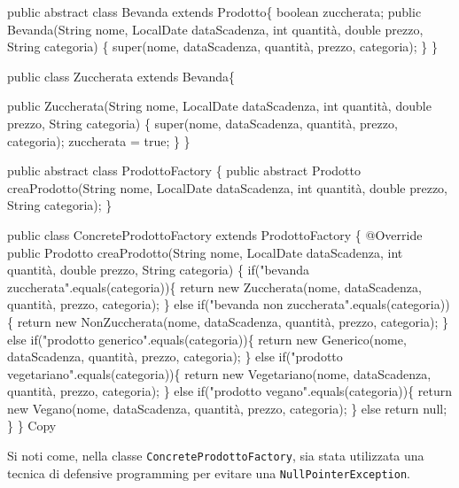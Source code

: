 \documentclass[
]{article}
\newenvironment{Shaded}{}{}
\newcommand{\NormalTok}[1]{#1}
\begin{document}
\begin{Shaded}
\begin{Highlighting}[]
\NormalTok{public abstract class Bevanda extends Prodotto\{  }
\NormalTok{    boolean zuccherata;  }
\NormalTok{    public Bevanda(String nome, LocalDate dataScadenza, int quantità, double prezzo, String categoria) \{  }
\NormalTok{       super(nome, dataScadenza, quantità, prezzo, categoria);  }
\NormalTok{    \}  }
\NormalTok{\}}

\NormalTok{public class Zuccherata extends Bevanda\{  }
  
\NormalTok{    public Zuccherata(String nome, LocalDate dataScadenza, int quantità, double prezzo, String categoria) \{  }
\NormalTok{       super(nome, dataScadenza, quantità, prezzo, categoria);   }
\NormalTok{       zuccherata = true;  }
\NormalTok{    \}}
\NormalTok{\}}

\NormalTok{public abstract class ProdottoFactory \{  }
\NormalTok{    public abstract Prodotto creaProdotto(String nome, LocalDate dataScadenza, int quantità, double prezzo, String categoria);  }
\NormalTok{\}}

\NormalTok{public class ConcreteProdottoFactory extends ProdottoFactory \{}
\NormalTok{    @Override}
\NormalTok{    public Prodotto creaProdotto(String nome, LocalDate dataScadenza, int quantità, double prezzo, String categoria) \{}
\NormalTok{        if("bevanda zuccherata".equals(categoria))\{}
\NormalTok{            return new Zuccherata(nome, dataScadenza, quantità, prezzo, categoria);}
\NormalTok{        \} else if("bevanda non zuccherata".equals(categoria))\{}
\NormalTok{            return new NonZuccherata(nome, dataScadenza, quantità, prezzo, categoria);}
\NormalTok{        \} else if("prodotto generico".equals(categoria))\{}
\NormalTok{            return new Generico(nome, dataScadenza, quantità, prezzo, categoria);}
\NormalTok{        \} else if("prodotto vegetariano".equals(categoria))\{}
\NormalTok{            return new Vegetariano(nome, dataScadenza, quantità, prezzo, categoria);}
\NormalTok{        \} else if("prodotto vegano".equals(categoria))\{}
\NormalTok{            return new Vegano(nome, dataScadenza, quantità, prezzo, categoria);}
\NormalTok{        \} else return null;}
\NormalTok{    \}}
\NormalTok{\}}
\NormalTok{Copy}
\end{Highlighting}
\end{Shaded}

Si noti come, nella classe \texttt{ConcreteProdottoFactory}, sia stata
utilizzata una tecnica di defensive programming per evitare una
\texttt{NullPointerException}.
\end{document}
